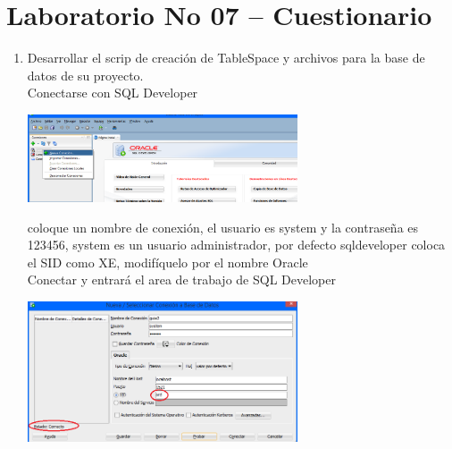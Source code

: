 \section{Laboratorio No 07 – Cuestionario} 

\begin{enumerate}[1.]
	
	\item Desarrollar el scrip de creaci\'on de TableSpace y archivos para la base de datos de su proyecto.
	\\Conectarse con SQL Developer

	\begin{center}
	\includegraphics[width=8cm]{./Imagenes/eje7_con}
	\end{center}	
	coloque un nombre de conexi\'on, el usuario es system y la contraseña es 123456, system es un usuario administrador, por defecto sqldeveloper coloca el SID como XE, modif\'iquelo por el nombre Oracle
	\\Conectar y entrar\'a el area de trabajo de SQL Developer

	\begin{center}
	\includegraphics[width=8cm]{./Imagenes/eje_con1}
	\end{center}	


\end{enumerate}
